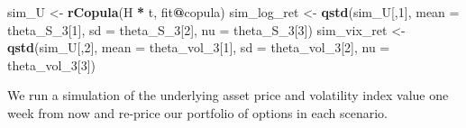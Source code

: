 \documentclass[]{article}
\newenvironment{Shaded}{\begin{snugshade}}{\end{snugshade}}
\newcommand{\DataTypeTok}[1]{\textcolor[rgb]{0.13,0.29,0.53}{#1}}
\newcommand{\DecValTok}[1]{\textcolor[rgb]{0.00,0.00,0.81}{#1}}
\newcommand{\KeywordTok}[1]{\textcolor[rgb]{0.13,0.29,0.53}{\textbf{#1}}}
\newcommand{\NormalTok}[1]{#1}
\newcommand{\OperatorTok}[1]{\textcolor[rgb]{0.81,0.36,0.00}{\textbf{#1}}}
\newcommand{\StringTok}[1]{\textcolor[rgb]{0.31,0.60,0.02}{#1}}
\begin{document}
\begin{Shaded}
\begin{Highlighting}[]
\NormalTok{sim\_U       <{-}}\StringTok{ }\KeywordTok{rCopula}\NormalTok{(H }\OperatorTok{*}\StringTok{ }\NormalTok{t, fit}\OperatorTok{@}\NormalTok{copula)}
\NormalTok{sim\_log\_ret <{-}}\StringTok{ }\KeywordTok{qstd}\NormalTok{(sim\_U[,}\DecValTok{1}\NormalTok{], }\DataTypeTok{mean =}\NormalTok{ theta\_S\_}\DecValTok{3}\NormalTok{[}\DecValTok{1}\NormalTok{], }\DataTypeTok{sd =}\NormalTok{ theta\_S\_}\DecValTok{3}\NormalTok{[}\DecValTok{2}\NormalTok{], }\DataTypeTok{nu =}\NormalTok{ theta\_S\_}\DecValTok{3}\NormalTok{[}\DecValTok{3}\NormalTok{])}
\NormalTok{sim\_vix\_ret <{-}}\StringTok{ }\KeywordTok{qstd}\NormalTok{(sim\_U[,}\DecValTok{2}\NormalTok{], }\DataTypeTok{mean =}\NormalTok{ theta\_vol\_}\DecValTok{3}\NormalTok{[}\DecValTok{1}\NormalTok{], }\DataTypeTok{sd =}\NormalTok{ theta\_vol\_}\DecValTok{3}\NormalTok{[}\DecValTok{2}\NormalTok{], }\DataTypeTok{nu =}\NormalTok{ theta\_vol\_}\DecValTok{3}\NormalTok{[}\DecValTok{3}\NormalTok{])}
\end{Highlighting}
\end{Shaded}

We run a simulation of the underlying asset price and volatility index
value one week from now and re-price our portfolio of options in each
scenario.
\end{document}
